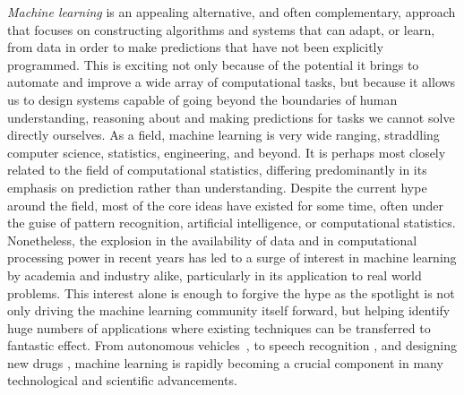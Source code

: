 \emph{Machine learning} is an appealing alternative, and often complementary,
approach that focuses on constructing algorithms and systems that can adapt, or learn, from data in order
to make predictions that have not been explicitly programmed.
This is exciting not only because of the potential it brings
to automate and improve a wide array of computational tasks, but because it allows us to design 
systems capable of going beyond the boundaries of human understanding, reasoning
about and making predictions for tasks we cannot solve directly ourselves.
As a field, machine learning is very wide ranging,
straddling computer science, statistics, engineering, and beyond. 
It is perhaps most closely related to the field of computational statistics, differing predominantly
in its emphasis on prediction rather than understanding.  Despite the current hype around the
field, most of the core ideas have existed for some
time, often under the guise of pattern recognition, artificial intelligence, or computational 
statistics.  Nonetheless, the explosion in the availability of data and in computational processing power in recent
years has led to a surge of interest in machine learning by academia and industry alike, particularly 
in its application to real world problems.  This interest alone is enough to forgive the hype as the
spotlight is not only driving the machine learning community itself forward, but helping identify
huge numbers of applications where existing techniques can be transferred to fantastic effect.
From autonomous vehicles~\citep{lefevre2014survey}, to speech recognition \citep{jurafsky2014speech},
and designing new drugs \citep{burbidge2001drug}, machine learning is rapidly becoming a 
crucial component in many technological and scientific advancements.  


